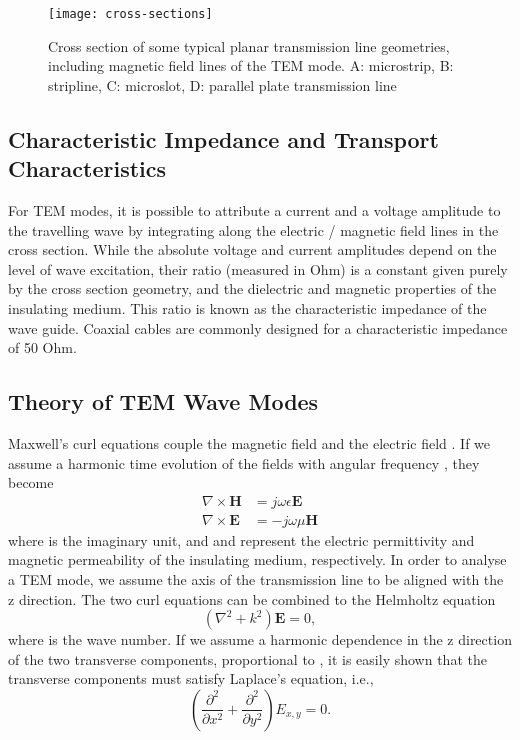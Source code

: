 \begin{figure}
	\begin{center}
		\texttt{[image: cross-sections]}
	\end{center}
	\caption{Cross section of some typical planar transmission line geometries,
  		including magnetic field lines of the TEM mode. A: microstrip, B: stripline, C: microslot, D: parallel plate transmission line}
	\label{fig:cross-sections}
\end{figure}

\subsection{Characteristic Impedance and Transport
Characteristics}\label{characteristic-impedance-and-transport-characteristics}

For TEM modes, it is possible to attribute a current and a voltage
amplitude to the travelling wave by integrating along the electric /
magnetic field lines in the cross section. While the absolute voltage
and current amplitudes depend on the level of wave excitation, their
ratio (measured in Ohm) is a constant given purely by the cross section
geometry, and the dielectric and magnetic properties of the insulating
medium. This ratio is known as the characteristic impedance  of
the wave guide. Coaxial cables are commonly designed for a
characteristic impedance of 50 Ohm.

\subsection{Theory of TEM Wave Modes}\label{theory-of-tem-wave-modes}

Maxwell's curl equations couple the magnetic field  and
the electric field . If we assume a harmonic time
evolution of the fields with angular frequency \m{\omega}, they become
%
\begin{eqnarray}
\nabla \times \mathbf{H} &= j \omega \epsilon \mathbf{E} \\
\nabla \times \mathbf{E} &= - j\omega \mu \mathbf{H}
\end{eqnarray}
%
where  is the imaginary unit, and \m{\epsilon} and
\m{\mu} represent the electric permittivity and magnetic permeability of
the insulating medium, respectively. In order to analyse a TEM mode, we
assume the axis of the transmission line to be aligned with the z
direction. The two curl equations can be combined to the Helmholtz
equation
%
\begin{equation}
(\nabla^2+k^2) \mathbf{E}  =0,
\end{equation}
%
where  is the wave number. If we assume a
harmonic dependence in the z direction of the two transverse components,
proportional to , it is easily shown that the transverse
components must satisfy Laplace's equation, i.e.,
%
\begin{equation}
\left(\frac{\partial^2}{\partial x^2}+ \frac{\partial^2}{\partial y^2}\right) E_{x,y} = 0.
\end{equation}

